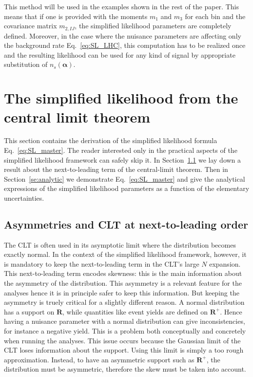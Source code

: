 \documentclass[11pt]{article}
\begin{document}
This method will be used in the examples shown in the rest of the paper. This means that if one is provided with the moments $m_{1}$ and $m_{3}$ for each bin and the covariance matrix $m_{2,IJ}$, the simplified likelihood parameters are completely defined. Moreover, in the case where the nuisance parameters are affecting only the background rate Eq.~\eqref{eq:SL_LHC}, this computation has to be realized once and the resulting likelihood can be used for any kind of signal by appropriate substitution of $n_{s}(\bm{\alpha})$.




\section{The simplified likelihood from the central limit theorem}
\label{se:SL_theory}

This section contains the derivation of the simplified likelihood formula Eq.~\eqref{eq:SL_master}.
The reader interested only in the practical aspects of the simplified likelihood framework can safely skip it. In Section~\ref{se:skew_CLT} we lay down a  result about the next-to-leading term of the central-limit theorem. Then in Section~\ref{se:analytic} we demonstrate Eq.~\eqref{eq:SL_master} and give the analytical expressions of the simplified likelihood parameters as a function of the elementary uncertainties.

\subsection{Asymmetries and CLT at next-to-leading order}
\label{se:skew_CLT}

The CLT is often used in its asymptotic limit where the distribution becomes exactly normal. In the context of the simplified likelihood framework, however, it is mandatory to keep the next-to-leading  term in the CLT's large $N$ expansion. This next-to-leading term encodes skewness: this is the main information about the asymmetry of the distribution. This asymmetry is a relevant feature for the analyses hence it is in principle safer to keep this information. But keeping the asymmetry is truely critical for a slightly different reason. A normal distribution has a support on $\mathbf{R}$, while quantities like event yields are defined on $\mathbf{R}^+$. Hence having a nuisance parameter with a normal distribution can give inconsistencies, for instance a negative yield. This is a problem both conceptually and concretely when running the  analyses. This issue occurs because the  Gaussian limit of the CLT  loses information about the support. Using this limit is simply a too rough approximation.
  Instead, to have an asymmetric support such as $\mathbf{R}^+$,  the distribution must be asymmetric, therefore the skew must be taken into account.
\end{document}

